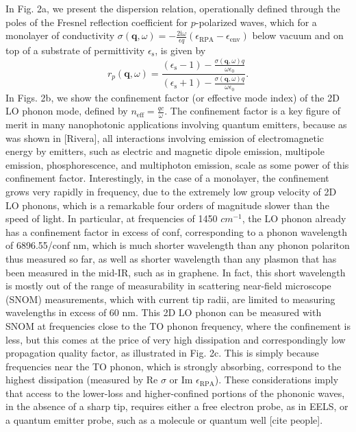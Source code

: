 \documentclass[aps,prb,twocolumn,
	groupedaddress,superscriptaddress,
	amsfonts,amssymb,amsmath,floatfix,
	citeautoscript]{revtex4-1}
\newcommand{\iu}{\mathrm{i}}
\begin{document}
In Fig. 2a, we present the dispersion relation, operationally defined through the poles of the Fresnel reflection coefficient for $p$-polarized waves, which for a monolayer of conductivity $\sigma(\mathbf{q},\omega) = -\frac{2\iu \omega}{\epsilon q}\left(\epsilon_{\mathrm{RPA}} - \epsilon_{\mathrm{env}} \right)$ below vacuum and on top of a substrate of permittivity $\epsilon_{\mathrm{s}}$, is given by
\begin{equation}
r_p(\mathbf{q},\omega) = \frac{(\epsilon_{\mathrm{s}}-1)-\frac{\sigma(\mathbf{q},\omega) q}{\omega\epsilon_0}}{(\epsilon_{\mathrm{s}}+1)-\frac{\sigma(\mathbf{q},\omega) q}{\omega \epsilon_0}}.
\end{equation}
In Figs. 2b, we show the confinement factor (or effective mode index) of the 2D LO phonon mode, defined by $n_{\mathrm{eff}} = \frac{qc}{\omega}$. The confinement factor is a key figure of merit in many nanophotonic applications involving quantum emitters, because as was shown in [Rivera], all interactions involving emission of electromagnetic energy by emitters, such as electric and magnetic dipole emission, multipole emission, phosphorescence, and multiphoton emission, scale as some power of this confinement factor. Interestingly, in the case of a monolayer, the confinement grows very rapidly in frequency, due to the extremely low group velocity of 2D LO phonons, which is a remarkable four orders of magnitude slower than the speed of light.  In particular, at frequencies of 1450 $cm^{-1}$, the LO phonon already has a confinement factor in excess of conf, corresponding to a phonon wavelength of 6896.55/conf nm, which is much shorter wavelength than any phonon polariton thus measured so far, as well as shorter wavelength than any plasmon that has been measured in the mid-IR, such as in graphene. In fact, this short wavelength is mostly out of the range of measurability in scattering near-field microscope (SNOM) measurements, which with current tip radii, are limited to measuring wavelengths in excess of 60 nm. This 2D LO phonon can be measured with SNOM at frequencies close to the TO phonon frequency, where the confinement is less, but this comes at the price of very high dissipation and correspondingly low propagation quality factor, as illustrated in Fig. 2c. This is simply because frequencies near the TO phonon, which is strongly absorbing, correspond to the highest dissipation (measured by $\text{Re }\sigma$ or $\text{Im }\epsilon_{\mathrm{RPA}}$). These considerations imply that access to the lower-loss and higher-confined portions of the phononic waves, in the absence of a sharp tip, requires either a free electron probe, as in EELS, or a quantum emitter probe, such as a molecule or quantum well [cite people].
\end{document}
